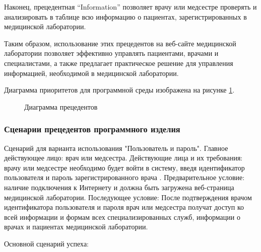 Наконец, прецедентная ``Information'' позволяет врачу или медсестре проверять и анализировать в таблице всю информацию о пациентах, зарегистрированных в медицинской лаборатории.

Таким образом, использование этих прецедентов на веб-сайте медицинской лаборатории позволяет эффективно управлять пациентами, врачами и специалистами, а также предлагает практическое решение для управления информацией, необходимой в медицинской лаборатории.

Диаграмма приоритетов для программной среды изображена на рисунке \ref{img:usua}.

\begin{figure}
	\caption{Диаграмма прецедентов}
	\label{img:usua}
\end{figure}

\subsubsection{Сценарии прецедентов программного изделия}

Сценарий для варианта использования "Пользователь и пароль".
Главное действующее лицо: врач или медсестра.
Действующие лица и их требования: врачу или медсестре необходимо будет войти в систему, введя идентификатор пользователя и пароль зарегистрированного врача .
Предварительное условие: наличие подключения к Интернету и должна быть загружена веб-страница медицинской лаборатории.
Последующее условие: После подтверждения врачом идентификатора пользователя и пароля врач или медсестра получат доступ ко всей информации и формам всех специализированных служб, информации о врачах и пациентах медицинской лаборатории.

Основной сценарий успеха:

